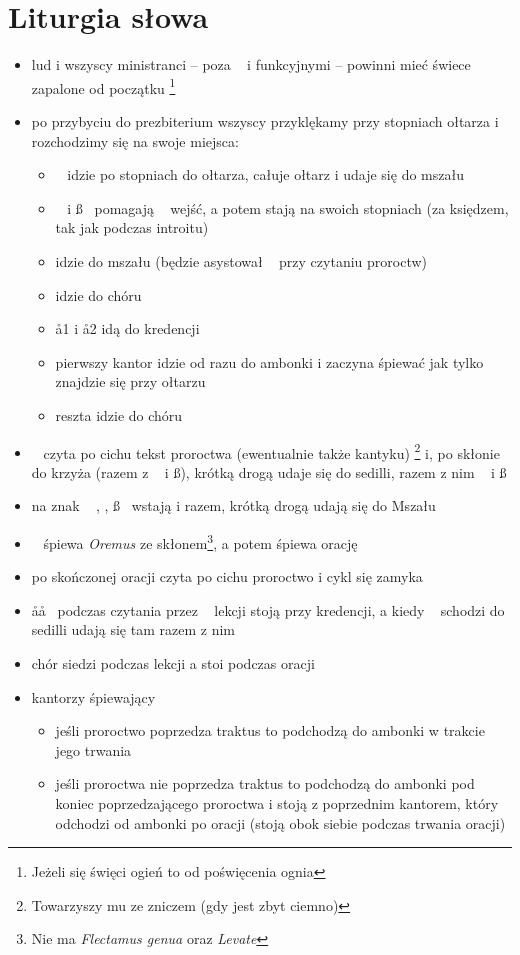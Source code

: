 \section{Liturgia słowa}

\begin{itemize}
	\item lud i wszyscy ministranci -- poza \ii~ i funkcyjnymi -- powinni mieć
	      świece zapalone od początku \footnote{Jeżeli się święci ogień to od
		      poświęcenia ognia}
	\item po przybyciu do prezbiterium wszyscy przyklękamy przy stopniach
	      ołtarza i rozchodzimy się na swoje miejsca:
	      \begin{itemize}
		      \item \ii~ idzie po stopniach do ołtarza, całuje ołtarz i udaje
		            się do mszału
		      \item \dd~ i \ss~ pomagają \ii~ wejść, a potem stają na swoich
		            stopniach (za księdzem, tak jak podczas introitu)
		      \item {} idzie do mszału (będzie asystował \ii~ przy czytaniu
		            proroctw)
		      \item {} idzie do chóru
		      \item \aa1 i \aa2 idą do kredencji
		      \item pierwszy kantor idzie od razu do ambonki i zaczyna śpiewać
		            jak tylko \ii~ znajdzie się przy ołtarzu
		      \item reszta idzie do chóru
	      \end{itemize}
	\item \ii~ czyta po cichu tekst proroctwa (ewentualnie także kantyku)
	      \footnote{Towarzyszy mu  ze zniczem (gdy jest zbyt ciemno)} i, po
	      skłonie do krzyża (razem z \dd~ i \ss), krótką drogą udaje się do
	      sedilli, razem z nim \dd~ i \ss
	\item na znak ~ \ii, \dd, \ss~ wstają i razem, krótką drogą udają się do Mszału
	\item \ii~ śpiewa \textit{Oremus} ze skłonem\footnote{Nie ma
		      \textit{Flectamus genua} oraz \textit{Levate}}, a potem śpiewa
	      orację
	\item po skończonej oracji czyta po cichu proroctwo i cykl się zamyka
	\item \aa\aa~ podczas czytania przez \ii~ lekcji stoją przy kredencji, a
	      kiedy \ii~ schodzi do sedilli udają się tam razem z nim
	\item chór siedzi podczas lekcji a stoi podczas oracji
	\item kantorzy śpiewający
	      \begin{itemize}
		      \item jeśli proroctwo poprzedza traktus to podchodzą do ambonki w
		            trakcie jego trwania
		      \item jeśli proroctwa nie poprzedza traktus to podchodzą do
		            ambonki pod koniec poprzedzającego proroctwa i stoją z
		            poprzednim kantorem, który odchodzi od ambonki po oracji
		            (stoją obok siebie podczas trwania oracji)
	      \end{itemize}
\end{itemize}